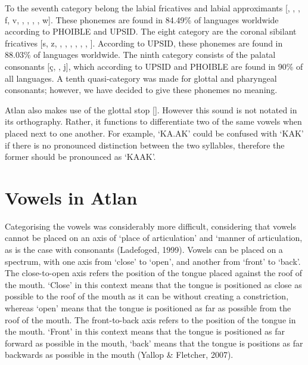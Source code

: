 To the seventh category belong the labial fricatives and labial approximants [, \textphi, \textbeta, f, v, \texttheta, \dh, \textscriptv , \textturnw, w]. These phonemes are found in 84.49\% of languages worldwide according to PHOIBLE and UPSID. The eight category are the coronal sibilant fricatives [s, z, \textesh, \textyogh, \textrtails , \textrtailz, \textctc, \textctz,  \texththeng]. According to UPSID, these phonemes are found in 88.03\% of languages worldwide. The ninth category consists of the palatal consonants [\c{c}, \textctj, j], which according to UPSID and PHOIBLE are found in 90\% of all languages. A tenth quasi-category was made for glottal and pharyngeal consonants; however, we have decided to give these phonemes no meaning. 

Atlan also makes use of the glottal stop [\textglotstop]. However this sound is not notated in its orthography. Rather, it functions to differentiate two of the same vowels when placed next to one another. For example, ‘KA.AK’ could be confused with ‘KAK’ if there is no pronounced distinction between the two syllables, therefore the former should be pronounced as ‘KA\textglotstop AK’\footnotemark.  


\section{Vowels in Atlan}

Categorising the vowels was considerably more difficult, considering that vowels cannot be placed on an axis of ‘place of articulation’ and ‘manner of articulation, as is the case with consonants (Ladefoged, 1999). Vowels can be placed on a spectrum, with one axis from ‘close’ to ‘open’, and another from ‘front’ to ‘back’. The close-to-open axis refers the position of the tongue placed against the roof of the mouth. ‘Close’ in this context means that the tongue is positioned as close as possible to the roof of the mouth as it can be without creating a constriction, whereas ‘open’ means that the tongue is positioned as far as possible from the roof of the mouth. The front-to-back axis refers to the position of the tongue in the mouth. ‘Front’ in this context means that the tongue is positioned as far forward as possible in the mouth, ‘back’ means that the tongue is positions as far backwards as possible in the mouth (Yallop \& Fletcher, 2007). 

